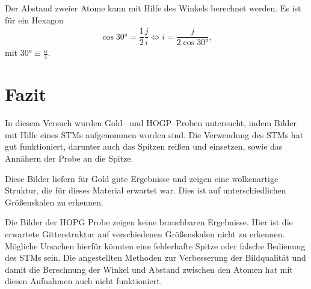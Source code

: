 \documentclass[sn-mathphys-num,iicol]{sn-jnl}
\theoremstyle{thmstyleone}
\theoremstyle{thmstyletwo}
\theoremstyle{thmstylethree}
\begin{document}
Der Abstand zweier Atome kann mit Hilfe des Winkels berechnet werden.
Es ist für ein Hexagon
\begin{align} 
  \cos \ang{30}=\dfrac{1}{2}\dfrac{j}{i}\Leftrightarrow i=\dfrac{j}{2\cos \ang{30}}
,\end{align} 
mit $\ang{30}\equiv \tfrac{\alpha }{4}$.


\section{Fazit}
In diesem Versuch wurden Gold-- und HOGP--Proben untersucht, indem Bilder mit Hilfe eines STMs aufgenommen worden sind.
Die Verwendung des STMs hat gut funktioniert, darunter auch das Spitzen reißen und einsetzen, sowie das Annähern der Probe an die Spitze.

Diese Bilder liefern für Gold gute Ergebnisse und zeigen eine wolkenartige Struktur, die für dieses Material erwartet war.
Dies ist auf unterschiedlichen Größenskalen zu erkennen.

Die Bilder der HOPG Probe zeigen keine brauchbaren Ergebnisse.
Hier ist die erwartete Gitterstruktur auf verschiedenen Größenskalen nicht zu erkennen.
Mögliche Ursachen hierfür könnten eine fehlerhafte Spitze oder falsche Bedienung des STMs sein.
Die angestellten Methoden zur Verbesserung der Bildqualität und damit die Berechnung der Winkel und Abstand zwischen den Atomen hat mit diesen Aufnahmen auch nicht funktioniert.



\clearpage
\end{document}

